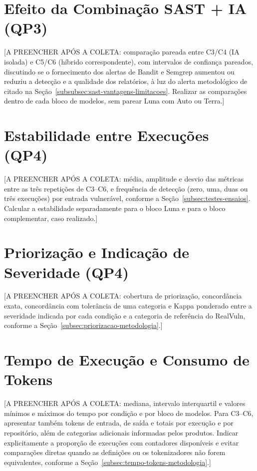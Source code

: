 \section{Efeito da Combinação SAST + IA (QP3)}\label{sec:efeito-hibrido}

[A PREENCHER APÓS A COLETA: comparação pareada entre C3/C4 (IA isolada) e C5/C6 (híbrido correspondente), com intervalos de confiança pareados, discutindo se o fornecimento dos alertas de Bandit e Semgrep aumentou ou reduziu a detecção e a qualidade dos relatórios, à luz do alerta metodológico de \cite{Croft2021RuleLearningSAST} citado na Seção~\ref{subsubsec:sast-vantagens-limitacoes}. Realizar as comparações dentro de cada bloco de modelos, sem parear Luna com Auto ou Terra.]

\section{Estabilidade entre Execuções (QP4)}\label{sec:estabilidade-execucoes}

[A PREENCHER APÓS A COLETA: média, amplitude e desvio das métricas entre as três repetições de C3--C6, e frequência de detecção (zero, uma, duas ou três execuções) por entrada vulnerável, conforme a Seção~\ref{subsec:testes-ensaios}. Calcular a estabilidade separadamente para o bloco Luna e para o bloco complementar, caso realizado.]

\section{Priorização e Indicação de Severidade (QP4)}\label{sec:priorizacao-resultados}

[A PREENCHER APÓS A COLETA: cobertura de priorização, concordância exata, concordância com tolerância de uma categoria e Kappa ponderado entre a severidade indicada por cada condição e a categoria de referência do RealVuln, conforme a Seção~\ref{subsec:priorizacao-metodologia}.]

\section{Tempo de Execução e Consumo de Tokens}\label{sec:tempo-tokens-resultados}

[A PREENCHER APÓS A COLETA: mediana, intervalo interquartil e valores mínimos e máximos do tempo por condição e por bloco de modelos. Para C3--C6, apresentar também tokens de entrada, de saída e totais por execução e por repositório, além de categorias adicionais informadas pelos produtos. Indicar explicitamente a proporção de execuções com contadores disponíveis e evitar comparações diretas quando as definições ou os tokenizadores não forem equivalentes, conforme a Seção~\ref{subsec:tempo-tokens-metodologia}.]

